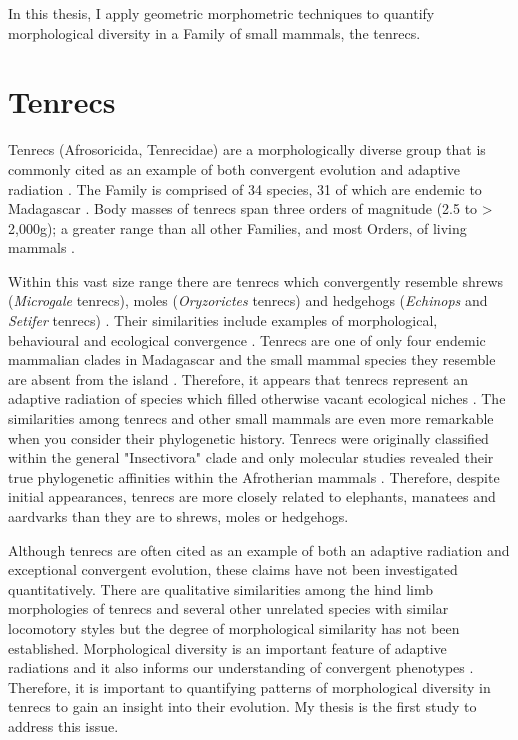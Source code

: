 	In this thesis, I apply geometric morphometric techniques to quantify morphological diversity in a Family of small mammals, the tenrecs.
\section{Tenrecs} %
	Tenrecs (Afrosoricida, Tenrecidae) are a morphologically diverse group that is commonly cited as an example of both convergent evolution and adaptive radiation \citep{Soarimalala2011, Eisenberg1969}. 
	The Family is comprised of 34 species, 31 of which are endemic to Madagascar \citep{Olson2013}. Body masses of tenrecs span three orders of magnitude (2.5 to > 2,000g); a greater range than all other Families, and most Orders, of living mammals \citep{Olson2003}.
	
	Within this vast size range there are tenrecs which convergently resemble shrews (\textit{Microgale} tenrecs), moles (\textit{Oryzorictes} tenrecs) and hedgehogs (\textit{Echinops} and \textit{Setifer} tenrecs) \citep{Eisenberg1969}. Their similarities include examples of morphological, behavioural and ecological convergence \citep{Soarimalala2011}. Tenrecs are one of only four endemic mammalian clades in Madagascar and the small mammal species they resemble are absent from the island \citep{Garbutt1999}. Therefore, it appears that tenrecs represent an adaptive radiation of species which filled otherwise vacant ecological niches \citep{Soarimalala2011}.
	The similarities among tenrecs and other small mammals are even more remarkable when you consider their phylogenetic history. Tenrecs were originally classified within the general "Insectivora" clade and only molecular studies revealed their true phylogenetic affinities within the Afrotherian mammals \citep{Stanhope1998}. Therefore, despite initial appearances, tenrecs are more closely related to elephants, manatees and aardvarks than they are to shrews, moles or hedgehogs. 
	

	Although tenrecs are often cited as an example of both an adaptive radiation and exceptional convergent evolution, these claims have not been investigated quantitatively. There are qualitative similarities among the hind limb morphologies of tenrecs and several other unrelated species with similar locomotory styles \citep{Salton2009} but the degree of morphological similarity has not been established. Morphological diversity is an important feature of adaptive radiations \citep{Losos2010a} and it also informs our understanding of convergent phenotypes \citep{Muschick2012}. Therefore, it is important to quantifying patterns of morphological diversity in tenrecs to gain an insight into their evolution. My thesis is the first study to address this issue. 

